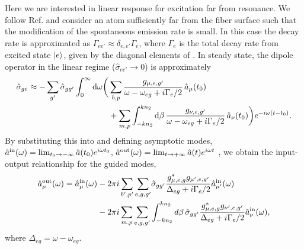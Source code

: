 \documentclass[preprint, aps,pra,onecolumn]{revtex4-1} %
\newcommand{\inp}{{\rm in}}
\newcommand{\out}{{\rm out}}
\begin{document}
Here we are interested in linear response for excitation far from resonance. We follow Ref. \cite{le_kien_propagation_2014} and consider an atom sufficiently far from the fiber surface such that the modification of the spontaneous emission rate is small.   In this case the decay rate is approximated as $\Gamma_{ee'} \approx \delta_{e,e'} \Gamma_{e}$, where $\Gamma_e$ is the total decay rate from excited state $\lvert{e}\rangle$, given by the diagonal elements of .  In steady state, the dipole operator in the linear regime ($\hat{\sigma}_{ee'} \rightarrow 0 $) is approximately
	\begin{align}
		\hat{\sigma}_{ge} \approx -\sum_{g'} \hat{\sigma}_{gg'}\int_0^{\infty}\mathrm{d}\omega \bigg( & \sum_{b,p}  
\frac{g_{\mu, e,g'}}{\omega-\omega_{eg} + i \Gamma_{e}/2  }\, \hat{a}_\mu (t_0) \\
	&+\sum_{m,p} \int_{-kn_2}^{kn_2}\mathrm{d}\beta \, \frac{g_{\nu, e,g'}}{\omega-\omega_{eg} + i \Gamma_{e}/2 } \,\hat{a}_\nu (t_0)  \bigg)e^{-i\omega (t-t_0)} . \nonumber
	\end{align}
By substituting this into  and defining asymptotic modes, $\hat{a}^{\inp}(\omega) = \lim_{t_0\rightarrow -\infty} \hat{a}(t_0) e^{i\omega t_0}$, $\hat{a}^{\out}(\omega) = \lim_{t\rightarrow +\infty} \hat{a}(t) e^{i\omega t}$ \cite{fan_input-output_2010}, we obtain the input-output relationship for the guided modes,
	\begin{align} \label{Eq::aout}
		\hat{a}^{\out}_\mu (\omega) = \hat{a}^{\inp}_\mu (\omega) &- 2\pi i\sum_{b',p'} 
\sum_{e,g,g'}\!\hat{\sigma}_{gg'}\frac{ g_{\mu,e,g}^* g_{\mu',e,g'}}{ \Delta_{eg} + i \Gamma_{e}/2 }\hat{a}^{\inp}_{\mu'}(\omega) \\
&- 2\pi i\sum_{m,p} \sum_{e,g,g'} \int^{kn_2}_{-kn_2} d\beta \,\hat{\sigma}_{gg'}\frac{ g_{\mu,e,g}^* g_{\nu',e,g'}}{ \Delta_{eg} + i \Gamma_{e}/2 }\hat{a}^{\inp}_{\nu}(\omega),\nn
	\end{align}
where $\Delta_{eg} = \omega - \omega_{eg}$. 
\end{document}
